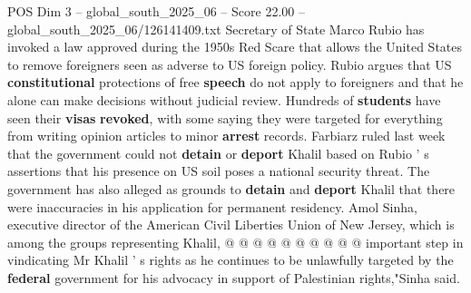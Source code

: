 \begin{textsample}{POS Dim 3 – global\_south\_2025\_06 – Score 22.00 – global\_south\_2025\_06/126141409.txt}
Secretary of State Marco Rubio has invoked a law approved during the 1950s Red Scare that allows the United States to remove foreigners seen as adverse to US foreign policy.
Rubio argues that US \textbf{constitutional} protections of free \textbf{speech} do not apply to foreigners and that he alone can make decisions without judicial review.
Hundreds of \textbf{students} have seen their \textbf{visas} \textbf{revoked}, with some saying they were targeted for everything from writing opinion articles to minor \textbf{arrest} records.
Farbiarz ruled last week that the government could not \textbf{detain} or \textbf{deport} Khalil based on Rubio ' s assertions that his presence on US soil poses a national security threat.
The government has also alleged as grounds to \textbf{detain} and \textbf{deport} Khalil that there were inaccuracies in his application for permanent residency.
Amol Sinha, executive director of the American Civil Liberties Union of New Jersey, which is among the groups representing Khalil, @ @ @ @ @ @ @ @ @ @ important step in vindicating Mr Khalil ' s rights as he continues to be unlawfully targeted by the \textbf{federal} government for his advocacy in support of Palestinian rights,"Sinha said.

\end{textsample}
